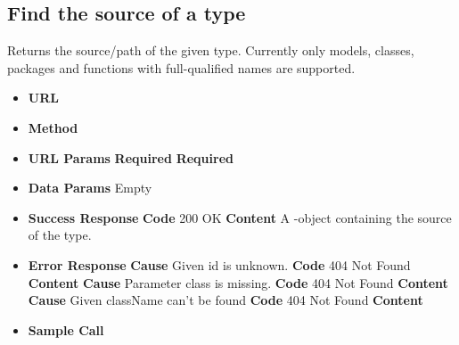 \subsection{Find the source of a type}
Returns the source/path of the given type.
Currently only models, classes, packages and functions with full-qualified names are supported.
\begin{itemize}
\item \textbf{URL} 
\item \textbf{Method} 

\item \textbf{URL Params}
  \newline\textbf{Required} 
  \newline\textbf{Required} 

\item \textbf{Data Params} Empty

\item \textbf{Success Response}
  \newline\textbf{Code} 200 OK
  \newline\textbf{Content} A -object containing the source of the type.

\item \textbf{Error Response}
  \newline\textbf{Cause} Given id is unknown.
  \newline\textbf{Code} 404 Not Found
  \newline\textbf{Content} 
  \newline\textbf{Cause} Parameter class is missing.
  \newline\textbf{Code} 404 Not Found
  \newline\textbf{Content} 
  \newline\textbf{Cause} Given className can't be found
  \newline\textbf{Code} 404 Not Found
  \newline\textbf{Content} 

\item \textbf{Sample Call}
\end{itemize}
